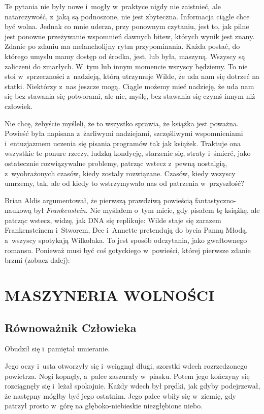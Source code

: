 \documentclass[oneside,polish,11pt,sfheadings]{mwbk}
\begin{document}
Te pytania nie były nowe i~mogły w~praktyce nigdy nie zaistnieć, ale
natarczywość, z~jaką są podnoszone, nie jest zbyteczna. Informacja
ciągle chce być wolna. Jednak co mnie uderza, przy ponownym czytaniu,
jest to, jak pilne jest ponowne przeżywanie wspomnień dawnych bitew,
których wynik jest znany. Zdanie po zdaniu ma melancholijny rytm
przypominania. Każda postać, do którego umysłu mamy dostęp od środka,
jest, lub była, maszyną. Wszyscy są zaliczeni do zmarłych. W~tym lub
innym momencie wszyscy będziemy. To nie stoi w~sprzeczności z~nadzieją,
którą utrzymuje Wilde, że uda nam się dotrzeć na statki. Niektórzy z~nas
jeszcze mogą. Ciągle możemy mieć nadzieję, że uda nam się bez stawania
się potworami, ale nie, myślę, bez stawania się czymś innym niż
człowiek.

Nie chcę, żebyście myśleli, że to wszystko sprawia, że książka jest
poważna. Powieść była napisana z~żarliwymi nadziejami, szczęśliwymi
wspomnieniami i~entuzjazmem uczenia się pisania programów tak jak
książek. Traktuje ona wszystkie te ponure rzeczy, ludzką kondycję,
starzenie się, straty i~śmierć, jako ostatecznie rozwiązywalne problemy,
patrząc wstecz z~pewną nostalgią, z~wyobrażonych czasów, kiedy zostały
rozwiązane. Czasów, kiedy wszyscy umrzemy, tak, ale od kiedy to
wstrzymywało nas od patrzenia w~przyszłość?

Brian Aldis argumentował, że pierwszą prawdziwą powieścią
fantastyczno-naukową był \emph{Frankenstein}. Nie myślałem o~tym micie,
gdy pisałem tę książkę, ale patrząc wstecz, widzę, jak DNA się
replikuje: Wilde staje się zarazem Frankensteinem i~Stworem, Dee i~Annette pretendują do bycia Panną Młodą, a~wszyscy spotykają Wilkołaka.
To jest sposób odczytania, jako gwałtownego romansu. Ponieważ musi być
coś gotyckiego w~powieści, której pierwsze zdanie brzmi (zobacz dalej):


\part{MASZYNERIA WOLNOŚCI}
\chapter{Równoważnik Człowieka}

Obudził się i~pamiętał umieranie.

Jego oczy i~usta otworzyły się i~wciągnął długi, szorstki wdech
rozrzedzonego powietrza. Nogi kopnęły, a~palce zaszurały w~piasku. Potem
jego kończyny się rozciągnęły się i~leżał spokojnie. Każdy wdech był
prędki, jak gdyby podejrzewał, że następny mógłby być jego ostatnim.
Jego palce wbiły się w~ziemię, gdy patrzył prosto w~górę na
głęboko-niebieskie niezgłębione niebo.
\end{document}
